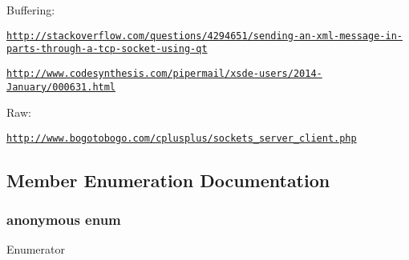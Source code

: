Buffering\-: \par
\href{http://stackoverflow.com/questions/4294651/sending-an-xml-message-in-parts-through-a-tcp-socket-using-qt}{\tt http\-://stackoverflow.\-com/questions/4294651/sending-\/an-\/xml-\/message-\/in-\/parts-\/through-\/a-\/tcp-\/socket-\/using-\/qt} \par
\href{http://www.codesynthesis.com/pipermail/xsde-users/2014-January/000631.html}{\tt http\-://www.\-codesynthesis.\-com/pipermail/xsde-\/users/2014-\/\-January/000631.\-html} \par
Raw\-: \par
\href{http://www.bogotobogo.com/cplusplus/sockets_server_client.php}{\tt http\-://www.\-bogotobogo.\-com/cplusplus/sockets\-\_\-server\-\_\-client.\-php} 

\subsection{Member Enumeration Documentation}
\hypertarget{classCAsioCrclSession_a459056f275a7910eeaf4f1ce2a4d48e3}{\subsubsection[{anonymous enum}]{\setlength{\rightskip}{0pt plus 5cm}anonymous enum\hspace{0.3cm}{\ttfamily [protected]}}}\label{classCAsioCrclSession_a459056f275a7910eeaf4f1ce2a4d48e3}
\begin{Desc}
\item[Enumerator]\par
\begin{description}
\item[{\em 
\hypertarget{classCAsioCrclSession_a459056f275a7910eeaf4f1ce2a4d48e3a5e7b7a77c3bed2e03563151933b78440}{max\-\_\-length}\label{classCAsioCrclSession_a459056f275a7910eeaf4f1ce2a4d48e3a5e7b7a77c3bed2e03563151933b78440}
}]\end{description}
\end{Desc}


